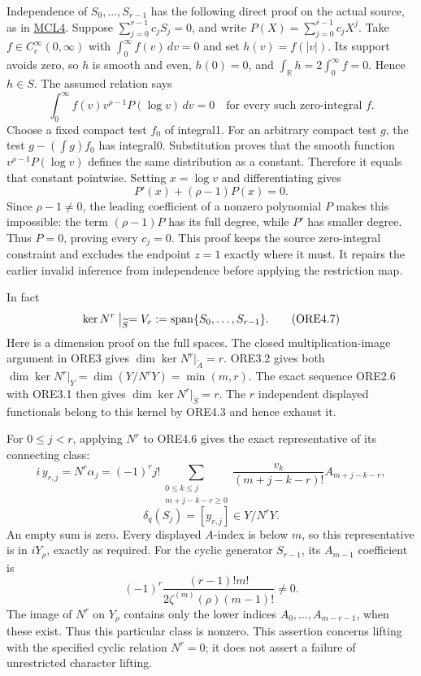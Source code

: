 Independence of \(S_0,\ldots,S_{r-1}\) has the following direct proof on
the actual source, as in
\href{ORIGINAL_MELLIN_CHARACTER_LIFTING.md}{MCL4}. Suppose
\(\sum_{j=0}^{r-1}c_jS_j=0\), and write \(P(X)=\sum_{j=0}^{r-1}c_jX^j\).
Take \(f\in C_c^\infty(0,\infty)\) with \(\int_0^\infty f(v)\,dv=0\) and
set \(h(v)=f(|v|)\). Its support avoids zero, so \(h\) is smooth and
even, \(h(0)=0\), and \(\int_{\mathbb R}h=2\int_0^\infty f=0\). Hence
\(h\in S\). The assumed relation says \[
\int_0^\infty f(v)v^{\rho-1}P(\log v)\,dv=0
\quad\text{for every such zero-integral }f.
\] Choose a fixed compact test \(f_0\) of integral1. For an arbitrary
compact test \(g\), the test \(g-(\int g)f_0\) has integral0.
Substitution proves that the smooth function \(v^{\rho-1}P(\log v)\)
defines the same distribution as a constant. Therefore it equals that
constant pointwise. Setting \(x=\log v\) and differentiating gives \[
P'(x)+(\rho-1)P(x)=0.
\] Since \(\rho-1\ne0\), the leading coefficient of a nonzero polynomial
\(P\) makes this impossible: the term \((\rho-1)P\) has its full degree,
while \(P'\) has smaller degree. Thus \(P=0\), proving every \(c_j=0\).
This proof keeps the source zero-integral constraint and excludes the
endpoint \(z=1\) exactly where it must. It repairs the earlier invalid
inference from independence before applying the restriction map.

In fact \[
\ker N^r\bigm|_{\widetilde S}
=V_r:=\operatorname{span}\{S_0,\ldots,S_{r-1}\}.
\tag{ORE4.7}
\] Here is a dimension proof on the full spaces. The closed
multiplication-image argument in ORE3 gives
\(\dim\ker N^r|_{\widetilde A}=r\). ORE3.2 gives both
\(\dim\ker N^r|_Y=\dim(Y/N^rY)=\min(m,r)\). The exact sequence ORE2.6
with ORE3.1 then gives \(\dim\ker N^r|_{\widetilde S}=r\). The \(r\)
independent displayed functionals belong to this kernel by ORE4.3 and
hence exhaust it.

For \(0\le j<r\), applying \(N^r\) to ORE4.6 gives the exact
representative of its connecting class: \[
i\,y_{r,j}
=N^r\alpha_j
=(-1)^rj!\!
\sum_{\substack{0\le k\le j\\m+j-k-r\ge0}}
\frac{v_k}{(m+j-k-r)!}A_{m+j-k-r},
\] \[
\boxed{\delta_q(S_j)=[y_{r,j}]\in Y/N^rY.}
\tag{ORE4.8}
\] An empty sum is zero. Every displayed \(A\)-index is below \(m\), so
this representative is in \(iY_\rho\), exactly as required. For the
cyclic generator \(S_{r-1}\), its \(A_{m-1}\) coefficient is \[
(-1)^r\frac{(r-1)!m!}
{2\zeta^{(m)}(\rho)(m-1)!}\ne0.
\tag{ORE4.9}
\] The image of \(N^r\) on \(Y_\rho\) contains only the lower indices
\(A_0,\ldots,A_{m-r-1}\), when these exist. Thus this particular class
is nonzero. This assertion concerns lifting with the specified cyclic
relation \(N^r=0\); it does not assert a failure of unrestricted
character lifting.

